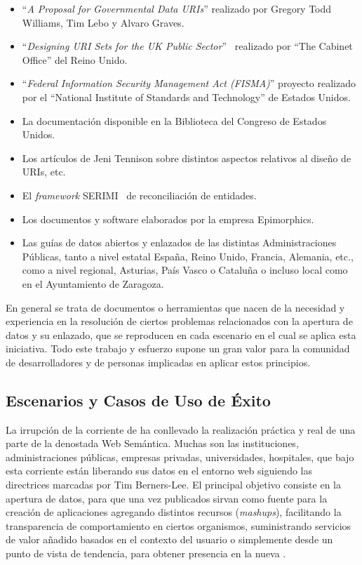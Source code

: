 \begin{itemize}
 \item ``\textit{A Proposal for Governmental Data URIs}'' realizado por Gregory Todd Williams, Tim Lebo y Alvaro Graves.  %
 \item ``\textit{Designing \gls{URI} Sets for the UK Public Sector}''~\cite{uris-uk} realizado por ``The Cabinet Office'' del Reino Unido. 
 \item ``\textit{Federal Information Security Management Act (FISMA)}'' proyecto realizado por  el ``National Institute of Standards and Technology'' de Estados Unidos.
 \item La documentación disponible en la Biblioteca del Congreso de Estados Unidos.
 \item Los artículos de Jeni Tennison sobre distintos aspectos relativos al diseño de URIs, etc.
 \item El \textit{framework} SERIMI~\cite{Serimi} de reconciliación de entidades.
 \item Los documentos y software elaborados por la empresa Epimorphics.
 \item Las guías de datos abiertos y enlazados de las distintas Administraciones Públicas, tanto a nivel estatal 
España, Reino Unido, Francia, Alemania, etc., como a nivel regional, Asturias, País Vasco o Cataluña o incluso local como
en el Ayuntamiento de Zaragoza.
\end{itemize}

En general se trata de documentos o herramientas que nacen de la necesidad y experiencia en la resolución de ciertos
 problemas relacionados con la apertura de datos y su enlazado, que se reproducen en cada escenario en el cual se
aplica esta iniciativa. Todo este trabajo y esfuerzo supone un gran valor para la comunidad de desarrolladores
y de personas implicadas en aplicar estos principios.

\subsection{Escenarios y Casos de Uso de Éxito}
La irrupción de la corriente de \linkeddata ha conllevado la realización práctica y real de una parte de la denostada Web
Semántica. Muchas son las instituciones, administraciones públicas,
empresas privadas, universidades, hospitales, que bajo esta corriente están
liberando sus datos en el entorno web siguiendo las directrices  marcadas por
Tim Berners-Lee. El principal objetivo consiste en la apertura de datos, para que
una vez publicados sirvan como fuente para la creación de aplicaciones agregando
distintos recursos (\textit{mashups}), facilitando la transparencia de comportamiento en
ciertos organismos, suministrando servicios de valor añadido basados en el contexto
del usuario o simplemente desde un punto de vista de tendencia, para obtener
presencia en la nueva \wod. 

